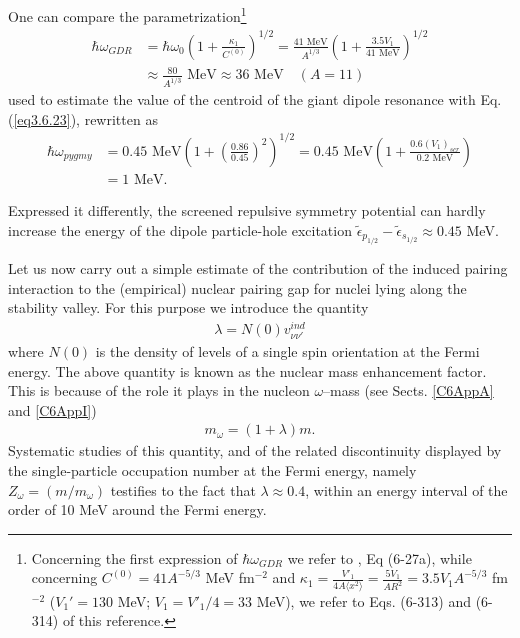 One can compare the parametrization\footnote{Concerning the first expression of $\hbar\omega_{GDR}$ we refer to \cite{Bohr:75}, Eq (6-27a), while concerning $C^{(0)}=41A^{-5/3}$ MeV fm$^{-2}$ and $\kappa_1=\frac{V'_1}{4A\langle x^2\rangle}=\frac{5V_1}{AR^2}=3.5V_1A^{-5/3}$ fm$^{-2}$ ($V_1'=130$ MeV; $V_1=V'_1/4=33$ MeV), we refer to Eqs. (6-313) and (6-314) of this reference.}
\begin{align}\label{eq4.8.21}
\nonumber\hbar\omega_{GDR}&=\hbar\omega_0\left(1+\frac{\kappa_1}{C^{(0)}}\right)^{1/2}=\frac{41\text{ MeV}}{A^{1/3}}\left(1+\frac{3.5 V_1}{41\text{ MeV}}\right)^{1/2}\\
&\approx\frac{80}{A^{1/3}}\text{ MeV}\approx36\text{ MeV}\quad(A=11)
\end{align}
used to estimate the value of the centroid of the giant dipole resonance with Eq. (\ref{eq3.6.23}), rewritten as
\begin{align}\label{eq4.8.22}
\nonumber\hbar\omega_{pygmy}&=0.45\text{ MeV}\left(1+\left(\frac{0.86}{0.45}\right)^2\right)^{1/2}=0.45\text{ MeV}\left(1+\frac{0.6(V_1)_{scr}}{0.2\text{ MeV}}\right)\\
&=1\text{ MeV}.
\end{align}



Expressed it differently, the screened repulsive symmetry potential can hardly increase the energy of the dipole particle-hole excitation $\tilde\epsilon_{p_{1/2}}-\tilde\epsilon_{s_{1/2}}\approx0.45$ MeV.

Let us now carry out a simple estimate of the contribution of the induced pairing interaction to the (empirical) nuclear pairing gap for nuclei lying along the stability valley. For this purpose we introduce the quantity
 \begin{align}
\lambda=N(0)v_{\nu\nu'}^{ind}
 \end{align}
where $N(0)$ is the density of levels of a single spin orientation at the Fermi energy. The above quantity is known as the nuclear mass enhancement factor. This is because of the role it plays in the nucleon $\omega$--mass (see Sects. \ref{C6AppA} and \ref{C6AppI})
 \begin{align}
m_\omega=(1+\lambda)m.
 \end{align}
Systematic studies of this quantity, and of the related discontinuity displayed by the single-particle occupation number at the Fermi energy, namely $Z_\omega=(m/m_\omega)$ testifies to the fact that $\lambda\approx0.4$, within an energy interval of the order of 10 MeV around the Fermi energy.


